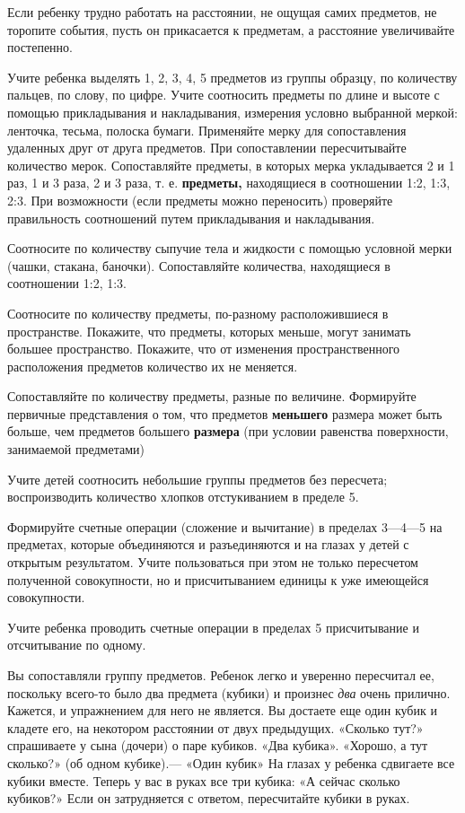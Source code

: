\documentclass[a5paper]{book}
\renewcommand{\emph}[1]{\textit{#1}}
\begin{document}
Если ребенку трудно работать на расстоянии, не ощущая самих предметов,
не торопите события, пусть он прикасается к предметам, а расстояние
увеличивайте постепенно.

Учите ребенка выделять 1, 2, 3, 4, 5 предметов из группы образцу, по
количеству пальцев, по слову, по цифре. Учите соотносить предметы по
длине и высоте с помощью прикладывания и накладывания, измерения условно
выбранной меркой: ленточка, тесьма, полоска бумаги. Применяйте мерку для
сопоставления удаленных друг от друга предметов. При сопоставлении
пересчитывайте количество мерок. Сопоставляйте предметы, в которых мерка
укладывается 2 и 1 раз, 1 и 3 раза, 2 и 3 раза, т. е. \textbf{предметы,}
находящиеся в соотношении 1:2, 1:3, 2:3. При возможности (если предметы
можно переносить) проверяйте правильность соотношений путем
прикладывания и накладывания.

Соотносите по количеству сыпучие тела и жидкости с помощью условной
мерки (чашки, стакана, баночки). Сопоставляйте количества, находящиеся в
соотношении 1:2, 1:3.

Соотносите по количеству предметы, по-разному расположившиеся в
пространстве. Покажите, что предметы, которых меньше, могут занимать
большее пространство. Покажите, что от изменения пространственного
расположения предметов количество их не меняется.

Сопоставляйте по количеству предметы, разные по величине. Формируйте
первичные представления о том, что предметов \textbf{меньшего} размера
может быть больше, чем предметов большего \textbf{размера} (при условии
равенства поверхности, занимаемой предметами)

Учите детей соотносить небольшие группы предметов без пересчета;
воспроизводить количество хлопков отстукиванием в пределе 5.

Формируйте счетные операции (сложение и вычитание) в пределах 3---4---5
на предметах, которые объединяются и разъединяются и на глазах у детей с
открытым результатом. Учите пользоваться при этом не только пересчетом
полученной совокупности, но и присчитыванием единицы к уже имеющейся
совокупности.

Учите ребенка проводить счетные операции в пределах 5 присчитывание и
отсчитывание по одному.

Вы сопоставляли группу предметов. Ребенок легко и уверенно пересчитал
ее, поскольку всего-то было два предмета (кубики) и произнес \emph{два}
очень прилично. Кажется, и упражнением для него не является. Вы достаете
еще один кубик и кладете его, на некотором расстоянии от двух
предыдущих. «Сколько тут?» спрашиваете у сына (дочери) о паре кубиков.
«Два кубика». «Хорошо, а тут сколько?» (об одном кубике).--- «Один
кубик» На глазах у ребенка сдвигаете все кубики вместе. Теперь у вас в
руках все три кубика: «А сейчас сколько кубиков?» Если он затрудняется с
ответом, пересчитайте кубики в руках.
\end{document}
